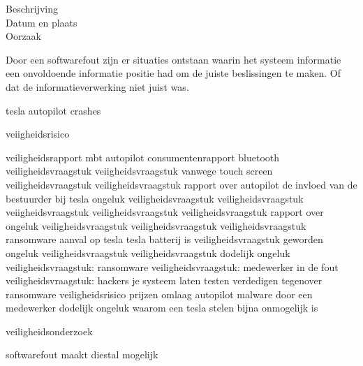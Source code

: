 \begin{description}
\item[Beschrijving]
\item[Datum en plaats] 
\item[Oorzaak]
\end{description}
Door een softwarefout zijn er situaties ontstaan waarin het systeem informatie een onvoldoende informatie positie had om de juiste beslissingen te maken. Of dat de informatieverwerking niet juist was.


tesla autopilot crashes


veiigheidsrisico

\cite{evan01042019teslaautopilotIntersection}
\cite{testVehicleSafetyReport}
veiligheidsrapport mbt autopilot
\cite{lambert31062020q2safetyreport}
consumentenrapport
bluetooth veiligheidsvraagstuk
\cite{wiredBloutoothHackTesla}
veiigheidsvraagstuk vanwege touch screen
\cite{preston14012021NHTSATeslaRecall}
veiligheidsvraagstuk
\cite{cio25112020belgianTeslaHack}
veiligheidsvraagstuk
rapport over autopilot
\cite{templeton06092019HTSBReportTesla}
de invloed van de bestuurder bij tesla ongeluk
veiligheidsvraagstuk
\cite{darkReading17112020TeslaBackup}
veiligheidsvraagstuk
\cite{leyden23032020TeslaInterfaceHack}
veiigheidsvraagstuk
\cite{huddlestonjr03042019ChineseTeslaHack}
veiligheidsvraagstuk
veiligheidsvraagstuk
\cite{heilweil26022020teslaAutopilot}
rapport over ongeluk
veiligheidsvraagstuk
veiligheidsvraagstuk
\cite{blanco04102019NHTSATesla}
veiligheidsvraagstuk
ransomware aanval op tesla
tesla batterij is veiligheidsvraagstuk geworden
\cite{mitchell01072020teslabatterycooling}
ongeluk
\cite{bbc26022020AutopilotCrash}
veiligheidsvraagstuk
veiligheidsvraagstuk
\cite{stumpff04052020TeslaPersonalData}
dodelijk ongeluk
\cite{levin08062018teslaautopilotsafety}
veiligheidsvraagstuk: ransomware
veiligheidsvraagstuk: medewerker in de fout
\cite{cbrook06082021TeslaInsideDataThreft}
\cite{shilling25022021Tesla}
veiligheidsvraagstuk: hackers je systeem laten testen
verdedigen tegenover ransomware
veiligheidsrisico
prijzen omlaag
autopilot
\cite{randall05112019modelSurvey}
malware door een medewerker
dodelijk ongeluk
\cite{fottrell03092018TeslaSecurityChecks}
waarom een tesla stelen bijna onmogelijk is



veiligheidsonderzoek



softwarefout maakt diestal mogelijk


